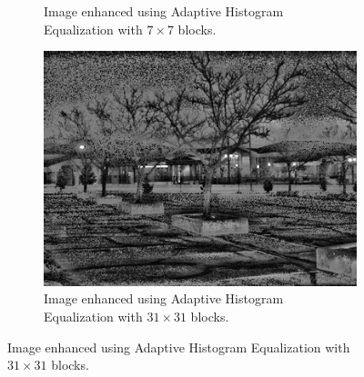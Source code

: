 \documentclass[a4paper, landscape]{article}
\begin{document}
\begin{figure}
\begin{subfigure}{0.32\linewidth}
        \caption{Image enhanced using Adaptive Histogram Equalization with $7\times 7$ blocks.}
    \end{subfigure}
    \begin{subfigure}{0.32\linewidth}
        \centering
        \includegraphics[width=\linewidth]{medium_enhanced_LC1.png}
        \caption{Image enhanced using Adaptive Histogram Equalization with $31\times 31$ blocks.}
    \end{subfigure}
\end{figure}
\end{document}
